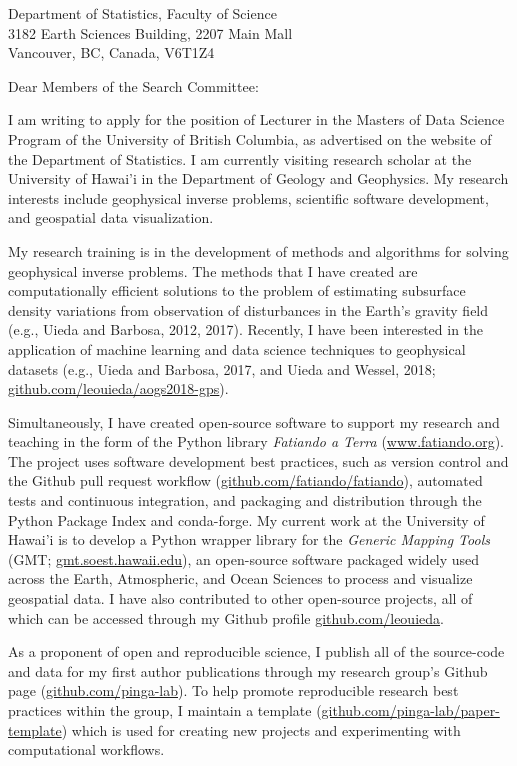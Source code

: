 \documentclass[11pt]{letter}
\begin{document}
\begin{letter}{
    Department of Statistics, Faculty of Science
    \\
    3182 Earth Sciences Building, 2207 Main Mall
    \\
    Vancouver, BC, Canada, V6T1Z4
}
\opening{Dear Members of the Search Committee:}

I am writing to apply for the position of Lecturer in the Masters of Data
Science Program of the University of British Columbia, as advertised on the
website of the Department of Statistics.
I am currently visiting research scholar at the University of Hawai'i in the
Department of Geology and Geophysics.
My research interests include geophysical inverse problems, scientific
software development, and geospatial data visualization.

My research training is in the development of methods and algorithms for
solving geophysical inverse problems.
The methods that I have created are computationally efficient
solutions to the problem of estimating subsurface density variations
from observation of disturbances in the Earth's gravity field (e.g., Uieda and
Barbosa, 2012, 2017).
Recently, I have been interested in the application of machine learning and
data science techniques to geophysical datasets
(e.g., Uieda and Barbosa, 2017, and Uieda and Wessel, 2018;
\href{https://github.com/leouieda/aogs2018-gps}{github.com/leouieda/aogs2018-gps}).

Simultaneously, I have created open-source software to support my research and
teaching in the form of the Python library \textit{Fatiando a Terra}
(\href{http://www.fatiando.org/}{www.fatiando.org}).
The project uses software development best practices, such as version control
and the Github pull request workflow
(\href{https://github.com/fatiando/fatiando}{github.com/fatiando/fatiando}),
automated tests and continuous integration,
and packaging and distribution through the Python Package Index and
conda-forge.
My current work at the University of Hawai'i is to develop a Python wrapper
library for the \textit{Generic Mapping Tools}
(GMT; \href{http://gmt.soest.hawaii.edu/}{gmt.soest.hawaii.edu}),
an open-source software packaged widely used across the Earth, Atmospheric, and
Ocean Sciences to process and visualize geospatial data.
I have also contributed to other open-source projects, all of which can be
accessed through my Github profile
\href{https://github.com/leouieda/}{github.com/leouieda}.

As a proponent of open and reproducible science, I publish all of the
source-code and data for my first author publications through my research
group's Github page
(\href{https://github.com/pinga-lab}{github.com/pinga-lab}).
To help promote reproducible research best practices within the group,
I maintain a template
(\href{https://github.com/pinga-lab/paper-template}{github.com/pinga-lab/paper-template})
which is used for creating new projects and experimenting with computational
workflows.


\end{letter}
\end{document}
